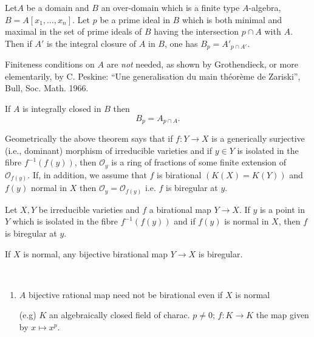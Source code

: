 {\begin{theorem*}%
  Let\pageoriginale $A$ be a domain and $B$ an over-domain which is a finite type
  $A$-algebra, $B = A [x_1,\ldots,x_n]$. Let $p$ be a prime ideal
  in $B$ which is both minimal and maximal in the set of prime ideals
  of $B$ having the intersection $p \cap A$ with $A$. Then if $A'$ is
  the integral closure of $A$ in $B$, one has $B_{p} = A'_{p \cap A'}$.     
\end{theorem*}

\begin{remark*}
  Finiteness conditions on $A$ are \textit{not} needed, as shown by\break
  Grothendieck, or more elementarily, by C. Peskine: ``Une
  generali\-sation du main th\'eor\`eme de Zariski'', Bull,
  Soc. Math. 1966. 
\end{remark*}

\begin{coro*}%
  If $A$ is integrally closed in $B$ then
  $$
  B_{p} = A_{p \cap A}.
  $$ 
\end{coro*}

Geometrically the above theorem says that if $f : Y \to X$ is a
generically surjective (i.e., dominant) morphism of irreducible
varieties and if $y \in Y$ is isolated in the fibre $f^{-1}(f(y))$,
then $\mathscr{O}_{y}$ is a ring of fractions of some finite extension
of $\mathscr{O}_{f(y)}$. If, in addition, we assume that $f$ is
birational $(K(X) = K(Y))$ and $f(y)$ normal in $X$ then
$\mathscr{O}_{y} = \mathscr{O}_{f(y)}$ i.e. $f$ is biregular at $y$.  

\begin{theorem*}[ (ZMT) ]%
  Let $X,Y$ be irreducible varieties and $f$ a birational map $Y \to X
  $. If $y$ is a point in $Y$ which is isolated in the fibre
  $f^{-1}(f(y))$ and if $f(y)$ is normal in $X$, then $f$ is biregular
  at $y$.      
\end{theorem*}
      
\begin{coro*}%
  If $X$ is normal, any bijective birational map $Y \to X$ is biregular.
\end{coro*}

\begin{remarks*}%
~

  \begin{enumerate}
    \item $A$ bijective rational map need not be birational even if
      $X$ is normal   
      
      (e.g) \quad $K$ an algebraically closed field of charac. $p \neq
      0; \, f : K \to K$ the map given by $x \mapsto x^{p}$.   


\end{enumerate}
\end{remarks*}}
